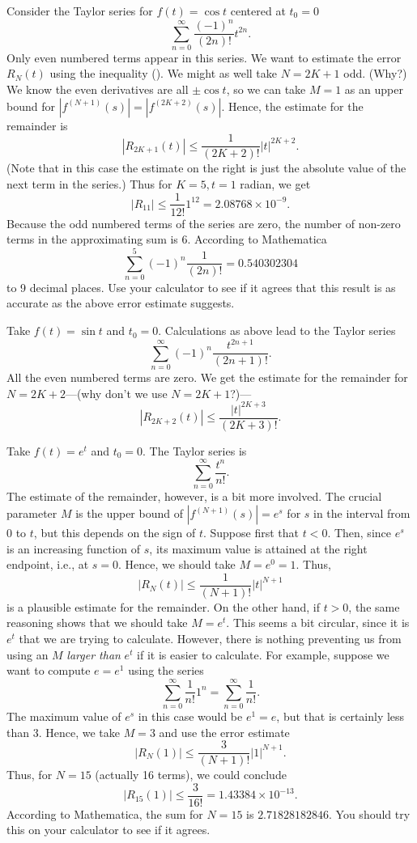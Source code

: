 \nextex
{}  Consider the Taylor series for
$f(t) = \cos t$ centered at $t_0 = 0$   
$$
\sum_{n=0}^\infty \frac{(-1)^n}{(2n)!}t^{2n}.
$$
Only even numbered terms appear in this series.   We want to estimate
the error $R_N(t)$ using the inequality (\AI).   We might as well
take $N = 2K+1$ odd.  (Why?)  We know the even derivatives are
all $\pm\cos t$, so we can take $M= 1$ as an upper bound for
$|f^{(N+1)}(s)| = |f^{(2K + 2)}(s)|$. Hence, the estimate for the
remainder is
$$
|R_{2K+1}(t)| \le \frac 1{(2K+2)!} |t|^{2K+2}.
$$
(Note that in this case the estimate on the right is just the
absolute value of the
next term in the series.)
Thus for $K = 5, t = 1$ radian, we get
$$
|R_{11}| \le \frac 1{12!} 1^{12} = 2.08768\times 10^{-9}.
$$
Because the odd numbered terms of the series are zero,
the number of non-zero terms in the approximating sum is 6.
According to Mathematica
$$
\sum_{n=0}^5 (-1)^n\frac 1{(2n)!} =  0.540302304
$$
to 9 decimal places.  Use your calculator to see if it agrees that
this result is as accurate as the above error estimate suggests.
\endexample

\nextex
{}  Take $f(t) = \sin t$ and $t_0 = 0$. 
Calculations as above lead to the Taylor series
$$
\sum_{n=0}^\infty (-1)^n\frac{t^{2n+1}}{(2n + 1)!}.
$$
All the even numbered terms are zero.  We get the estimate
for the remainder for $N = 2K + 2$---(why don't we use $N = 2K + 1$?)---
$$
|R_{2K+2}(t)| \le \frac{|t|^{2K + 3}}{(2K + 3)!}.
$$
\endexample

\nextex
{}
  Take $f(t) = e^t$ and $t_0 = 0$.   The Taylor
series is
$$
\sum_{n=0}^\infty \frac{t^n}{n!}.
$$
The estimate of the remainder, however, is a bit more involved.
The crucial parameter $M$ is the upper bound
of $|f^{(N+1)}(s)| = e^s$ for $s$ in the interval from $0$ to $t$,
but this
depends on the sign of $t$.  
Suppose first that $t < 0$.   Then, since $e^s$ is an increasing
function of $s$, its maximum value is attained at the right endpoint,
i.e., at $s = 0$.  Hence, we should take $M = e^0 = 1$.
Thus,
$$
|R_N(t)| \le \frac 1{(N+1)!} |t|^{N+1}
$$
is a plausible estimate for the remainder.
On the other hand, if $t > 0$, the same reasoning shows that
we should take $M = e^t$.  This seems a bit circular, since
it is $e^t$ that we are trying to calculate.  However, there is
nothing preventing us from using an $M$ {\it larger than\/}
$e^t$ if it is easier to calculate.
For example, suppose we want to compute $e = e^1$ using the
series
$$
  \sum_{n=0}^\infty \frac 1{n!} 1^n =
\sum_{n=0}^\infty \frac 1{n!}.
$$
The maximum value of $e^s$ in this case would be $e^1 = e$, but
that is certainly less than 3.  Hence, we take $M = 3$ and use the
error estimate
$$
|R_N(1)| \le \frac 3{(N+1)!} |1|^{N+1}.
$$
Thus, for $N = 15$ (actually 16 terms), we could conclude
$$
|R_{15}(1)| \le \frac 3{16!} = 1.43384\times 10^{-13}.
$$
According to Mathematica, the sum for $N = 15$ is
$2.71828182846$.  You should try this on your calculator to
see if it agrees.
\endexample

